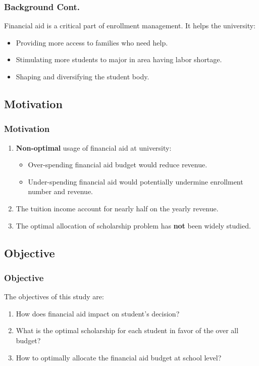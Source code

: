 \documentclass{beamer}
\begin{document}
\begin{frame}
\frametitle{Background Cont.}
Financial aid is a critical part of enrollment management.
It helps the university:
\begin{itemize}
\item Providing more access to families who need help.
\item Stimulating more students to major in area having labor shortage.
\item Shaping and diversifying the student body.
\end{itemize}
\end{frame}



\subsection{Motivation}
\begin{frame}
\frametitle{Motivation}

\begin{enumerate}
\item \textbf{Non-optimal} usage of financial aid at university:

\begin{itemize}
\item   Over-spending financial aid budget would reduce revenue.
\item   Under-spending financial aid would potentially
undermine enrollment number and revenue. 
\end{itemize}

\item The tuition income account for nearly half on the 
yearly revenue.

\item The optimal allocation of scholarship problem has 
\textbf{not} been widely studied.

\end{enumerate}
\end{frame}

\subsection{Objective}
\begin{frame}  
    \frametitle{Objective}
The objectives of this study are:
\begin{enumerate}
    \item How does financial aid impact on student's
    decision?
\item What is the optimal scholarship for each student in favor of the over 
    all budget?
    \item How to optimally allocate the financial aid budget at school level?
\end{enumerate}

\end{frame}
\end{document}
